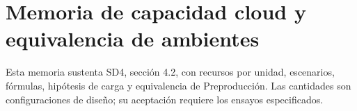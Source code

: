 \renewcommand{\thechapter}{A4.6}
\chapter{Memoria de capacidad cloud y equivalencia de ambientes}
Esta memoria sustenta SD4, sección 4.2, con recursos por unidad, escenarios, fórmulas, hipótesis de carga y equivalencia de Preproducción. Las cantidades son configuraciones de diseño; su aceptación requiere los ensayos especificados.


